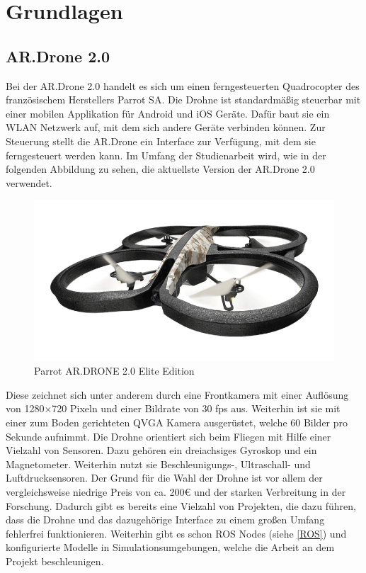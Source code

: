 \chapter{Grundlagen}
\label{cha:Fundamentals}

\section{AR.Drone 2.0}
Bei der AR.Drone 2.0 handelt es sich um einen ferngesteuerten Quadrocopter des französischem Herstellers Parrot SA. \cite{drone} Die Drohne ist standardmäßig steuerbar mit einer mobilen Applikation für Android und iOS Geräte. Dafür baut sie ein WLAN Netzwerk auf, mit dem sich andere Geräte verbinden können. Zur Steuerung stellt die AR.Drone ein Interface zur Verfügung, mit dem sie ferngesteuert werden kann. \newline
Im Umfang der Studienarbeit wird, wie in der folgenden Abbildung zu sehen, die aktuellste Version der AR.Drone 2.0 verwendet. \newline
\begin{figure}[ht]
	\centering
	\includegraphics[scale=0.5]{Bilder/ar_drone.png}
	\caption{Parrot AR.DRONE 2.0 Elite Edition \cite{dronepicture}}
	\label{fig:ardrone}
\end{figure}

Diese zeichnet sich unter anderem durch eine Frontkamera mit einer Auflösung von 1280×720 Pixeln und einer Bildrate von 30 fps aus. Weiterhin ist sie mit einer zum Boden gerichteten QVGA Kamera ausgerüstet, welche 60 Bilder pro Sekunde aufnimmt. \newline
Die Drohne orientiert sich beim Fliegen mit Hilfe einer Vielzahl von Sensoren. Dazu gehören ein dreiachsiges Gyroskop und ein Magnetometer. Weiterhin nutzt sie Beschleunigungs-, Ultraschall- und Luftdrucksensoren. \newline
Der Grund für die Wahl der Drohne ist vor allem der vergleichsweise niedrige Preis von ca. 200€ und der starken Verbreitung in der Forschung. Dadurch gibt es bereits eine Vielzahl von Projekten, die dazu führen, dass die Drohne und das dazugehörige Interface zu einem großen Umfang fehlerfrei funktionieren. \newline
Weiterhin gibt es schon ROS Nodes (siehe \ref{ROS}) und konfigurierte Modelle in Simulationsumgebungen, welche die Arbeit an dem Projekt beschleunigen.


